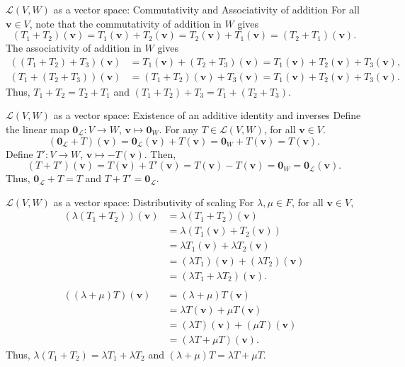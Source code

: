 \documentclass[handout]{beamer}
\def\v{\bm{v}}
\def\L{\mathcal{L}}
\begin{document}
        \begin{frame}{$\L(V, W)$ as a vector space: Commutativity and Associativity of addition}
                For all $\v\in V$, note that the commutativity of addition in $W$ gives
                \[
                        (T_1 + T_2)(\v) = T_1(\v) + T_2(\v) = T_2(\v) + T_1(\v) = (T_2 + T_1)(\v).
                \]
                The associativity of addition in $W$ gives
                \begin{align*}
                        ((T_1 + T_2) + T_3)(\v) &= T_1(\v) + (T_2 + T_3)(\v) = T_1(\v) + T_2(\v) + T_3(\v), \\
                        (T_1 + (T_2 + T_3))(\v) &= (T_1 + T_2)(\v) + T_3(\v) = T_1(\v) + T_2(\v) + T_3(\v).
                \end{align*}
                Thus, $T_1 + T_2 = T_2 + T_1$ and $(T_1 + T_2) + T_3 = T_1 + (T_2 + T_3)$.
        \end{frame}

        \begin{frame}{$\L(V, W)$ as a vector space: Existence of an additive identity and inverses}
                Define the linear map $\mathbf{0}_\L\colon V \to W$, $\v \mapsto \mathbf{0}_W$. For any $T \in \L(V, W)$, for all $\v \in V$.
                \[
                        (\mathbf{0}_\L + T)(\v) = \mathbf{0}_\L(\v) + T(\v) = \mathbf{0}_W + T(\v) = T(\v).
                \]
                Define $T'\colon V \to W$, $\v \mapsto -T(\v)$. Then,
                \[
                        (T + T')(\v) = T(\v) + T'(\v) = T(\v) - T(\v) = \mathbf{0}_W = \mathbf{0}_\L(\v).
                \]
                Thus, $\mathbf{0}_\L + T = T$ and $T + T' = \mathbf{0}_\L$.
        \end{frame}
        
        \begin{frame}{$\L(V, W)$ as a vector space: Distributivity of scaling}
                For $\lambda, \mu \in F$, for all $\v \in V$,
                \begin{align*}
                        (\lambda (T_1 + T_2))(\v) &= \lambda (T_1 + T_2)(\v) \\
                                &= \lambda(T_1(\v) + T_2(\v)) \\
                                &= \lambda T_1(\v) + \lambda T_2(\v) \\
                                &= (\lambda T_1)(\v) + (\lambda T_2)(\v) \\
                                &= (\lambda T_1 + \lambda T_2)(\v). \\\\
                        ((\lambda + \mu)T)(\v) &= (\lambda + \mu)T(\v) \\
                                &= \lambda T(\v) + \mu T(\v) \\
                                &= (\lambda T)(\v) + (\mu T)(\v) \\
                                &= (\lambda T + \mu T)(\v).
                \end{align*}
                Thus, $\lambda (T_1 + T_2) = \lambda T_1 + \lambda T_2$ and $(\lambda + \mu)T = \lambda T + \mu T$.
        \end{frame}
        
\end{document}

